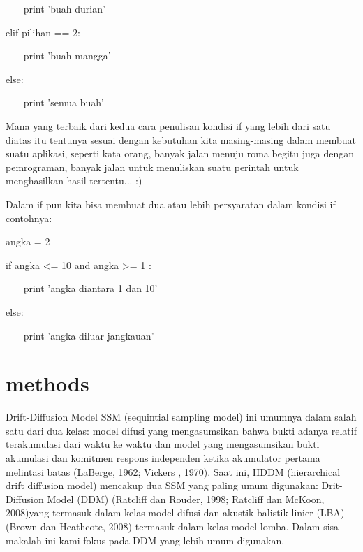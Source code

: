  
~~~ print 'buah durian' 

 
elif pilihan == 2: 

 
~~~ print 'buah mangga' 

 
else: 

 
~~~ print 'semua buah' 

 
Mana yang terbaik dari kedua cara penulisan kondisi if yang lebih dari satu diatas itu tentunya sesuai dengan kebutuhan kita masing-masing dalam membuat suatu aplikasi, seperti kata orang, banyak jalan menuju roma begitu juga dengan pemrograman, banyak jalan untuk menuliskan suatu perintah untuk menghasilkan hasil tertentu... :) 

 
Dalam if pun kita bisa membuat dua atau lebih persyaratan dalam kondisi   if   contohnya: 

 
angka = 2 

 
if angka <= 10 and angka >= 1 : 

 
~~~ print 'angka diantara 1 dan 10' 

 
else: 

 
~~~ print 'angka diluar jangkauan' 

\section {methods}
Drift-Diffusion Model
SSM (sequintial sampling model) ini umumnya dalam salah satu dari dua kelas: 
model difusi yang mengasumsikan bahwa bukti adanya relatif terakumulasi dari waktu ke waktu dan model yang mengasumsikan bukti
akumulasi dan komitmen respons independen ketika akumulator pertama melintasi batas (LaBerge, 1962; Vickers , 1970). 
Saat ini, HDDM (hierarchical drift diffusion model) mencakup dua SSM yang paling umum digunakan: Drit-Diffusion Model (DDM)
(Ratcliff dan Rouder, 1998; Ratcliff dan McKoon, 2008)yang termasuk dalam kelas model difusi dan akustik balistik linier (LBA) 
(Brown dan Heathcote, 2008) termasuk dalam kelas model lomba. Dalam sisa makalah ini kami fokus pada DDM yang lebih umum digunakan.



